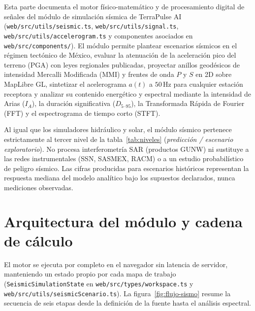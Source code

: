 \documentclass[11pt,a4paper]{article}
\newcommand{\src}[1]{\nolinkurl{#1}}
\newcommand{\unit}[1]{\mathrm{#1}}
\begin{document}
Esta parte documenta el motor físico-matemático y de procesamiento digital de señales del módulo de simulación
sísmica de TerraPulse AI (\src{web/src/utils/seismic.ts}, \src{web/src/utils/signal.ts},
\src{web/src/utils/accelerogram.ts} y componentes asociados en \src{web/src/components/}). El módulo permite
plantear escenarios sísmicos en el régimen tectónico de México, evaluar la atenuación de la aceleración pico del
terreno ($\mathrm{PGA}$) con leyes regionales publicadas, proyectar anillos geodésicos de intensidad Mercalli
Modificada ($\mathrm{MMI}$) y frentes de onda $P$ y $S$ en 2D sobre MapLibre GL, sintetizar el acelerograma
$a(t)$ a $50\,\unit{Hz}$ para cualquier estación receptora y analizar su contenido energético y espectral
mediante la intensidad de Arias ($I_A$), la duración significativa ($D_{5\text{--}95}$), la Transformada Rápida
de Fourier (FFT) y el espectrograma de tiempo corto (STFT).

\begin{atencion}
Al igual que los simuladores hidráulico y solar, el módulo sísmico pertenece estrictamente al tercer nivel de la
tabla~\ref{tab:niveles} (\emph{predicción / escenario exploratorio}). No procesa interferometría SAR (productos
GUNW) ni sustituye a las redes instrumentales (SSN, SASMEX, RACM) o a un estudio probabilístico de peligro
sísmico. Las cifras producidas para escenarios históricos representan la respuesta mediana del modelo analítico
bajo los supuestos declarados, nunca mediciones observadas.
\end{atencion}

\section{Arquitectura del módulo y cadena de cálculo}
\label{sec:sismo-arquitectura}

El motor se ejecuta por completo en el navegador sin latencia de servidor, manteniendo un estado propio por cada
mapa de trabajo (\texttt{SeismicSimulationState} en \src{web/src/types/workspace.ts} y
\src{web/src/utils/seismicScenario.ts}). La figura~\ref{fig:flujo-sismo} resume la secuencia de seis etapas
desde la definición de la fuente hasta el análisis espectral.
\end{document}
